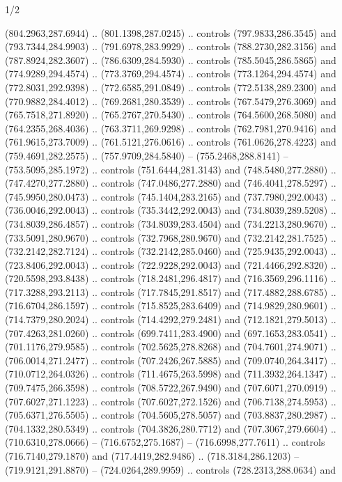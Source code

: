 \begin{flagdescription}{1/2}
\begin{scope}[shift={(2*\flaglength/3-0.25*\rb,0.51333\flagwidth)},scale=0.001715\flagwidth*\stretchfactor]
\begin{scope}[y=-1pt, x=1pt,cm={{1.04354,0.0,0.0,1.01818,(-827,-297)}}]
\begin{scope}[fill=gold]
  (804.2963,287.6944) .. (801.1398,287.0245) .. controls (797.9833,286.3545) and
  (793.7344,284.9903) .. (791.6978,283.9929) .. controls (788.2730,282.3156) and
  (787.8924,282.3607) .. (786.6309,284.5930) .. controls (785.5045,286.5865) and
  (774.9289,294.4574) .. (773.3769,294.4574) .. controls (773.1264,294.4574) and
  (772.8031,292.9398) .. (772.6585,291.0849) .. controls (772.5138,289.2300) and
  (770.9882,284.4012) .. (769.2681,280.3539) .. controls (767.5479,276.3069) and
  (765.7518,271.8920) .. (765.2767,270.5430) .. controls (764.5600,268.5080) and
  (764.2355,268.4036) .. (763.3711,269.9298) .. controls (762.7981,270.9416) and
  (761.9615,273.7009) .. (761.5121,276.0616) .. controls (761.0626,278.4223) and
  (759.4691,282.2575) .. (757.9709,284.5840) -- (755.2468,288.8141) --
  (753.5095,285.1972) .. controls (751.6444,281.3143) and (748.5480,277.2880) ..
  (747.4270,277.2880) .. controls (747.0486,277.2880) and (746.4041,278.5297) ..
  (745.9950,280.0473) .. controls (745.1404,283.2165) and (737.7980,292.0043) ..
  (736.0046,292.0043) .. controls (735.3442,292.0043) and (734.8039,289.5208) ..
  (734.8039,286.4857) .. controls (734.8039,283.4504) and (734.2213,280.9670) ..
  (733.5091,280.9670) .. controls (732.7968,280.9670) and (732.2142,281.7525) ..
  (732.2142,282.7124) .. controls (732.2142,285.0460) and (725.9435,292.0043) ..
  (723.8406,292.0043) .. controls (722.9228,292.0043) and (721.4466,292.8320) ..
  (720.5598,293.8438) .. controls (718.2481,296.4817) and (716.3569,296.1116) ..
  (717.3288,293.2113) .. controls (717.7845,291.8517) and (717.4882,288.6785) ..
  (716.6704,286.1597) .. controls (715.8525,283.6409) and (714.9829,280.9601) ..
  (714.7379,280.2024) .. controls (714.4292,279.2481) and (712.1821,279.5013) ..
  (707.4263,281.0260) .. controls (699.7411,283.4900) and (697.1653,283.0541) ..
  (701.1176,279.9585) .. controls (702.5625,278.8268) and (704.7601,274.9071) ..
  (706.0014,271.2477) .. controls (707.2426,267.5885) and (709.0740,264.3417) ..
  (710.0712,264.0326) .. controls (711.4675,263.5998) and (711.3932,264.1347) ..
  (709.7475,266.3598) .. controls (708.5722,267.9490) and (707.6071,270.0919) ..
  (707.6027,271.1223) .. controls (707.6027,272.1526) and (706.7138,274.5953) ..
  (705.6371,276.5505) .. controls (704.5605,278.5057) and (703.8837,280.2987) ..
  (704.1332,280.5349) .. controls (704.3826,280.7712) and (707.3067,279.6604) ..
  (710.6310,278.0666) -- (716.6752,275.1687) -- (716.6998,277.7611) .. controls
  (716.7140,279.1870) and (717.4419,282.9486) .. (718.3184,286.1203) --
  (719.9121,291.8870) -- (724.0264,289.9959) .. controls (728.2313,288.0634) and

\end{scope}
\end{scope}
\end{scope}
\end{flagdescription}
